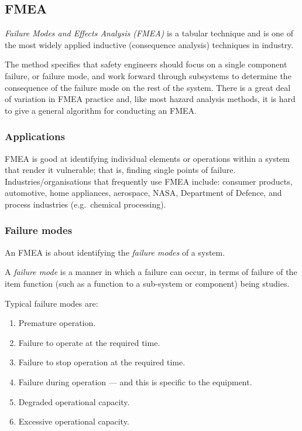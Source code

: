 \subsection{FMEA}
  
\emph{Failure Modes and Effects Analysis (FMEA)} is a tabular technique and is one of the most widely applied inductive (consequence analysis) techniques in industry.

The method specifies that safety engineers should focus on a single component failure, or failure mode, and work forward through subsystems to determine the consequence of the failure mode on the rest of the system.
There is a great deal of variation in FMEA practice and, like most hazard analysis methods, it is hard to give a general algorithm for conducting an FMEA.

\subsubsection*{Applications}

FMEA is good at identifying individual elements or operations within a system that render it vulnerable; that is, finding  single points of failure. Industries/organisations that frequently use FMEA include: consumer products, automotive, home appliances, aerospace, NASA, Department of Defence, and process industries (e.g.\ chemical processing).

\subsubsection*{Failure modes}

An FMEA is about identifying the \emph{failure modes} of a system.

\begin{definition}
A \emph{failure mode} is a manner in which a failure can occur, in terms of failure of the item function (such as a function to a sub-system or component) being studies.
\end{definition}

Typical failure modes are: 

  \begin{enumerate}
  \item Premature operation.
  \item Failure to operate at the required time.
  \item Failure to stop operation at the required time.
  \item Failure during operation --- and this is specific to the equipment.
  \item Degraded operational capacity.
  \item Excessive operational capacity.
  \end{enumerate}

